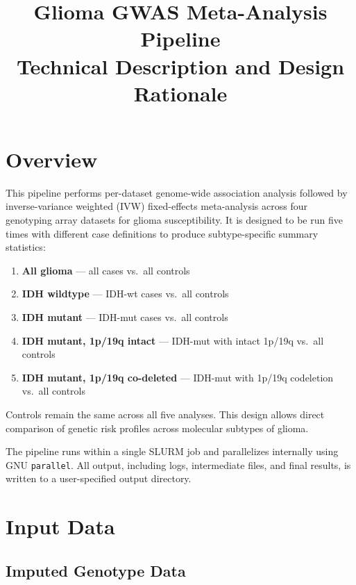 \documentclass[11pt,letterpaper]{article}
\title{\textbf{Glioma GWAS Meta-Analysis Pipeline}\\[0.3em]
\large Technical Description and Design Rationale}
\author{}
\date{}
\begin{document}
\maketitle

\tableofcontents
\newpage

\section{Overview}

This pipeline performs per-dataset genome-wide association analysis followed by inverse-variance weighted (IVW) fixed-effects meta-analysis across four genotyping array datasets for glioma susceptibility. It is designed to be run five times with different case definitions to produce subtype-specific summary statistics:

\begin{enumerate}[nosep]
    \item \textbf{All glioma} --- all cases vs.\ all controls
    \item \textbf{IDH wildtype} --- IDH-wt cases vs.\ all controls
    \item \textbf{IDH mutant} --- IDH-mut cases vs.\ all controls
    \item \textbf{IDH mutant, 1p/19q intact} --- IDH-mut with intact 1p/19q vs.\ all controls
    \item \textbf{IDH mutant, 1p/19q co-deleted} --- IDH-mut with 1p/19q codeletion vs.\ all controls
\end{enumerate}

Controls remain the same across all five analyses. This design allows direct comparison of genetic risk profiles across molecular subtypes of glioma.

The pipeline runs within a single SLURM job and parallelizes internally using GNU \texttt{parallel}. All output, including logs, intermediate files, and final results, is written to a user-specified output directory.

\section{Input Data}

\subsection{Imputed Genotype Data}
\end{document}
